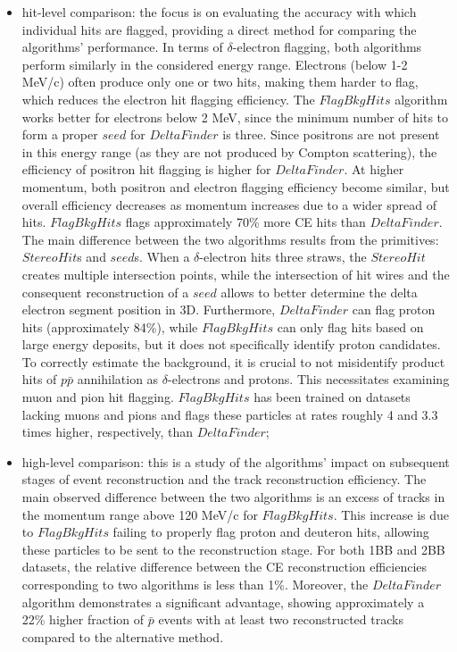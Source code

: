 \begin{itemize}
    \item hit-level comparison: the focus is on evaluating the 
    accuracy with which individual hits are flagged, providing a 
    direct method for comparing the algorithms' performance. In terms 
    of $\delta$-electron flagging, both algorithms perform similarly in the 
    considered energy range. Electrons (below 1-2 MeV/c) often produce only one 
    or two hits, making them harder to flag, which reduces the electron hit flagging 
    efficiency. The $FlagBkgHits$ algorithm works better for electrons below 
    2 MeV, since the minimum number of hits to form a 
    proper $seed$ for $DeltaFinder$ is three. 
    Since positrons are not present in this energy range (as they 
    are not produced by Compton scattering), the efficiency of positron hit flagging is higher for $DeltaFinder$.
    At higher momentum, both positron and 
    electron flagging efficiency become similar, but overall efficiency 
    decreases as momentum increases due to a wider spread of hits.
    $FlagBkgHits$ flags approximately 70\% more CE hits than $DeltaFinder$.
    The main difference between the two algorithms results from  
    the primitives: $StereoHit$s and $seed$s. When a $\delta$-electron hits three 
    straws, the $StereoHit$ creates multiple intersection points, while the 
    intersection of hit wires and the consequent reconstruction of 
    a $seed$ allows to better determine the delta electron segment position in 3D. 
    Furthermore, $DeltaFinder$ can flag proton hits (approximately 84\%), while $FlagBkgHits$ 
    can only flag hits based on large energy deposits, but it does not specifically identify proton candidates.
    To correctly estimate the background, it is crucial to not misidentify 
    product hits of $p\bar{p}$ annihilation as $\delta$-electrons and protons.
    This necessitates examining muon and pion hit flagging. $FlagBkgHits$ has been trained 
    on datasets lacking muons and pions and  
    flags these particles at rates roughly 4 and 3.3 times higher, 
    respectively, than $DeltaFinder$;
    
    \item high-level comparison: this is a study of the algorithms' 
    impact on subsequent stages of event reconstruction 
    and the track reconstruction efficiency. 
    The main observed difference between the two algorithms 
    is an excess of tracks in the momentum range above 120 MeV/c for  
    $FlagBkgHits$. 
    This increase is due to $FlagBkgHits$ failing to 
    properly flag proton and deuteron hits, allowing these particles to be sent to the 
    reconstruction stage. 
    For both 1BB and 2BB datasets, the relative difference between the 
    CE reconstruction efficiencies corresponding to two algorithms is less than 1\%.
    Moreover, the $DeltaFinder$ algorithm demonstrates a significant advantage, 
    showing approximately a 22\% higher fraction of $\bar{p}$ events with at least two reconstructed tracks compared to the alternative method.
\end{itemize}

